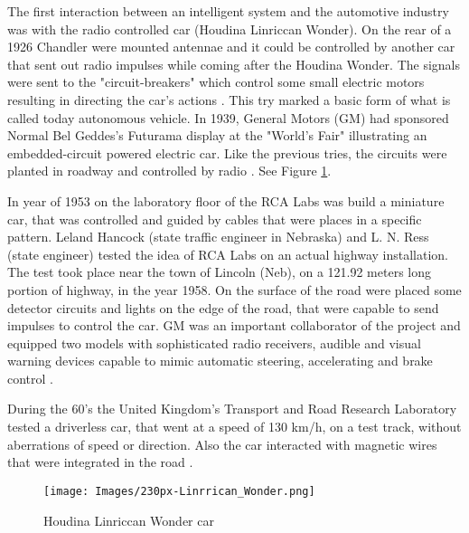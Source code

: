 The first interaction between an intelligent system and the automotive industry was with the radio controlled car (Houdina Linriccan Wonder). On the rear of a 1926 Chandler were mounted antennae and it could be controlled by another car that sent out radio impulses while coming after the Houdina Wonder. The signals were sent to the "circuit-breakers" which control some small electric motors resulting in directing the car's actions \cite{AutoAI}. This try marked a basic form of what is called today autonomous vehicle. In 1939, General Motors (GM) had sponsored Normal Bel Geddes's Futurama display at the "World's Fair" illustrating an embedded-circuit powered electric car. Like the previous tries, the circuits were planted in roadway and controlled by radio \cite{AutoAI}. See Figure \ref{fig:ex_autoCar}. \par

In year of 1953 on the laboratory floor of the RCA Labs was build a miniature car, that was controlled and guided by cables that were places in a specific pattern. Leland Hancock (state traffic engineer in Nebraska) and L. N. Ress (state engineer) tested the idea of RCA Labs on an actual highway installation. The test took place near the town of Lincoln (Neb), on a 121.92 meters long portion of highway, in the year 1958. On the surface of the road were placed some detector circuits and lights on the edge of the road, that were capable to send impulses to control the car. GM was an important collaborator of the project and equipped two models with sophisticated radio receivers, audible and visual warning devices capable to mimic automatic steering, accelerating and brake control \cite{AutoAI}. \par 

During the 60's the United Kingdom's Transport and Road Research Laboratory tested a driverless car, that went at a speed of 130 km/h, on a test track, without aberrations of speed or direction. Also the car interacted with magnetic wires that were integrated in the road \cite{AutoAI}. \par

\begin{figure}[h!]
    \centering
    \texttt{[image: Images/230px-Linrrican\_Wonder.png]}
    \caption[Houdina Linriccan Wonder car]{Houdina Linriccan Wonder car \protect\footnotemark}
    \label{fig:ex_autoCar}
\end{figure}



